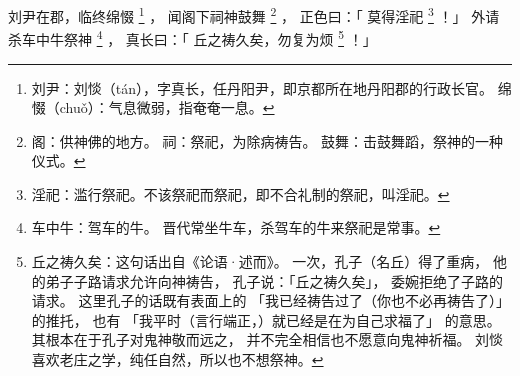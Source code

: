
\switchcolumn*[\section{}]

刘尹在郡，临终绵惙%
\footnote{%
    刘尹：刘惔（tán），字真长，任丹阳尹，即京都所在地丹阳郡的行政长官。
    绵惙（chuǒ）：气息微弱，指奄奄一息。
}%
，
闻阁下祠神鼓舞%
\footnote{%
    阁：供神佛的地方。
    祠：祭祀，为除病祷告。
    鼓舞：击鼓舞蹈，祭神的一种仪式。
}%
，
正色曰：「
    莫得淫祀%
    \footnote{%
        淫祀：滥行祭祀。不该祭祀而祭祀，即不合礼制的祭祀，叫淫祀。
    }%
！」
外请杀车中牛祭神%
\footnote{%
    车中牛：驾车的牛。
            晋代常坐牛车，杀驾车的牛来祭祀是常事。
}%
，
真长曰：「
    丘之祷久矣，勿复为烦%
    \footnote{%
        丘之祷久矣：这句话出自《论语·述而》。
                    一次，孔子（名丘）得了重病，
                    他的弟子子路请求允许向神祷告，
                    孔子说：「丘之祷久矣」，
                    委婉拒绝了子路的请求。
                    这里孔子的话既有表面上的
                    「我已经祷告过了（你也不必再祷告了）」
                    的推托，
                    也有
                    「我平时（言行端正，）就已经是在为自己求福了」
                    的意思。
                    其根本在于孔子对鬼神敬而远之，
                    并不完全相信也不愿意向鬼神祈福。
                    刘惔喜欢老庄之学，纯任自然，所以也不想祭神。
    }%
！」

\switchcolumn


